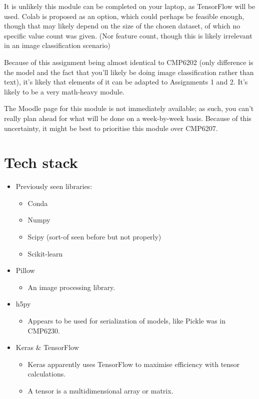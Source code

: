 \documentclass[12pt]{report}
\newcommand{\para}{\vspace{7pt}\noindent}
\begin{document}
\para It is unlikely this module can be completed on your laptop, as TensorFlow 
will be used. Colab is proposed as an option, which could perhaps be feasible enough, though 
that may likely depend on the size of the chosen dataset, of which no specific value 
count was given. (Nor feature count, though this is likely irrelevant in an image classification scenario)

\para Because of this assignment being almost identical to CMP6202 (only difference is the model and 
the fact that you'll likely be doing image classification rather than text),
it's likely that elements of it can be adapted to Assignments 1 and 2. It's likely to be a very math-heavy 
module.

\para The Moodle page for this module is not immediately available; as such, you can't really plan ahead 
for what will be done on a week-by-week basis. Because of this uncertainty, it might be best to prioritise 
this module over CMP6207.

\chapter*{Tech stack}
\begin{itemize}
    \item Previously seen libraries:
    \begin{itemize}
        \item Conda 
        \item Numpy
        \item Scipy (sort-of seen before but not properly)
        \item Scikit-learn 
    \end{itemize}
    \item Pillow
    \begin{itemize}
        \item An image processing library.
    \end{itemize}
    \item h5py
    \begin{itemize}
        \item Appears to be used for serialization of models, like Pickle was in CMP6230.
    \end{itemize}
    \item Keras \& TensorFlow
    \begin{itemize}
        \item Keras apparently uses TensorFlow to maximise efficiency with tensor calculations.
        \item A tensor is a multidimensional array or matrix.
    \end{itemize}
\end{itemize}
\end{document}
